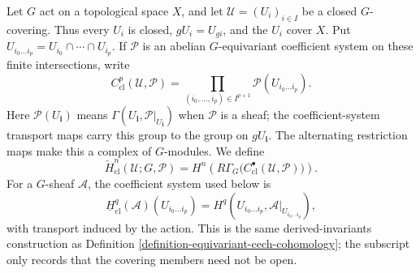 \begin{definition}
\label{definition-equivariant-cech-closed-covering}
\begin{reference}
\cite[Chapter V, \S 5.5, pp. 208--209]{Tohoku}
\end{reference}
Let $G$ act on a topological space $X$, and let
$\mathcal U=(U_i)_{i\in I}$ be a closed $G$-covering.  Thus every $U_i$ is
closed, $gU_i=U_{gi}$, and the $U_i$ cover $X$.  Put
$U_{i_0\ldots i_p}=U_{i_0}\cap\cdots\cap U_{i_p}$.  If $\mathcal P$ is an
abelian $G$-equivariant coefficient system on these finite intersections,
write
$$
C^p_{\mathrm{cl}}(\mathcal U,\mathcal P)=
\prod_{(i_0,\ldots,i_p)\in I^{p+1}}
\mathcal P(U_{i_0\ldots i_p}).
$$
Here $\mathcal P(U_{\mathbf i})$ means
$\Gamma(U_{\mathbf i},\mathcal P|_{U_{\mathbf i}})$ when $\mathcal P$ is a
sheaf; the coefficient-system transport maps carry this group to the group
on $gU_{\mathbf i}$.  The alternating restriction maps make this a complex
of $G$-modules.  We define
$$
\check H^n_{\mathrm{cl}}(\mathcal U;G,\mathcal P)=
H^n\left(R\Gamma_G\bigl(
C^\bullet_{\mathrm{cl}}(\mathcal U,\mathcal P)\bigr)\right).
$$
For a $G$-sheaf $\mathcal A$, the coefficient system used below is
$$
\underline H^q_{\mathrm{cl}}(\mathcal A)(U_{i_0\ldots i_p})
 =H^q(U_{i_0\ldots i_p},\mathcal A|_{U_{i_0\ldots i_p}}),
$$
with transport induced by the action.  This is the same derived-invariants
construction as Definition \ref{definition-equivariant-cech-cohomology};
the subscript only records that the covering members need not be open.
\end{definition}

